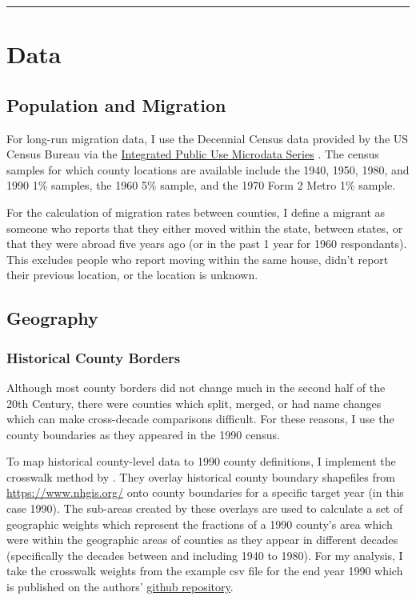 \documentclass[12pt]{article}
\begin{document}
\begin{center}\rule{0.5\linewidth}{0.5pt}\end{center}

\section{Data}\label{data}


\subsection{Population and Migration}\label{population-and-migration}

For long-run migration data, I use the Decennial Census data provided by
the US Census Bureau via the
\href{https://usa.ipums.org/usa/index.shtml}{Integrated Public Use
Microdata Series} \citep{ruggles_ipums_2024}. The census
samples for which county locations are available include the 1940, 1950,
1980, and 1990 1\% samples, the 1960 5\% sample, and the 1970 Form 2
Metro 1\% sample.

For the calculation of migration rates between counties, I define a
migrant as someone who reports that they either moved within the state,
between states, or that they were abroad five years ago (or in the past
1 year for 1960 respondants). This excludes people who report moving
within the same house, didn't report their previous location, or the
location is unknown.

\subsection{Geography}\label{geography}

\subsubsection{Historical County Borders}\label{historical-county-borders}

Although most county borders did not change much in the second half of
the 20th Century, there were counties which split, merged, or had name
changes which can make cross-decade comparisons difficult. For these
reasons, I use the county boundaries as they appeared in the 1990 census.


To map historical county-level data to 1990 county definitions, I implement the crosswalk
method by \cite{eckert_method_2020}. They overlay historical
county boundary shapefiles from \href{NHGIS}{https://www.nhgis.org/}
onto county boundaries for a specific target year (in this case 1990).
The sub-areas created by these overlays are used to calculate a set of
geographic weights which represent the fractions of a 1990 county's area
which were within the geographic areas of counties as they appear in
different decades (specifically the decades between and including 1940
to 1980). For my analysis, I take the crosswalk weights from the example
csv file for the end year 1990 which is published on the authors'
\href{https://github.com/liang-jack-a/EGLP_Crosswalk/tree/master}{github
repository}.
\end{document}
